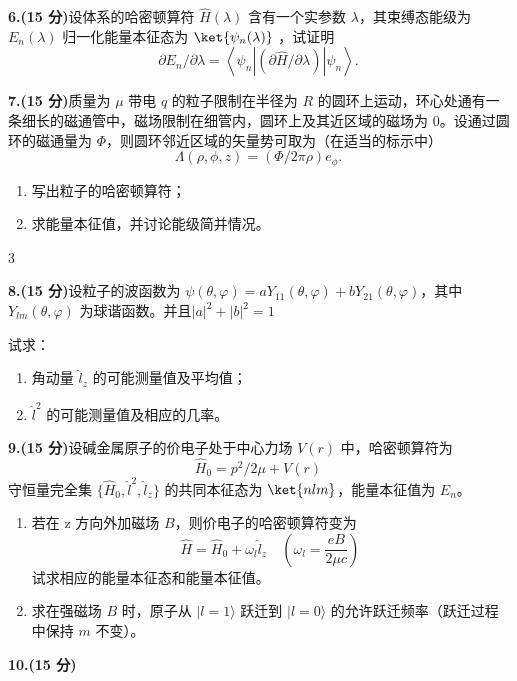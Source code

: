 \textbf{6.(15 分)}设体系的哈密顿算符 $\hat{H}(\lambda)$ 含有一个实参数 $\lambda$，其束缚态能级为 $E_n(\lambda)$ 归一化能量本征态为 $\ket{\psi_n(\lambda)}$ ，试证明
\[
\partial E_n/\partial \lambda = \left\langle \psi_n \left| (\partial \hat{H}/\partial \lambda) \right| \psi_n \right\rangle.~
\]

\textbf{7.(15 分)}质量为 $\mu$ 带电 $q$ 的粒子限制在半径为 $R$ 的圆环上运动，环心处通有一条细长的磁通管中，磁场限制在细管内，圆环上及其近区域的磁场为 $0$。设通过圆环的磁通量为 $\Phi$，则圆环邻近区域的矢量势可取为（在适当的标示中）
\[
\Lambda(\rho, \phi, z) = \left( \Phi/2\pi\rho \right) e_\phi.~
\]

\begin{enumerate}
    \item 写出粒子的哈密顿算符；
    \item 求能量本征值，并讨论能级简并情况。
\end{enumerate}3

\textbf{8.(15 分)}设粒子的波函数为 $\psi(\theta, \varphi) = aY_{11}(\theta, \varphi) + bY_{21}(\theta, \varphi)$，其中 $Y_{lm}(\theta, \varphi)$ 为球谐函数。并且$|a|^2 + |b|^2 = 1$

试求：
\begin{enumerate}
    \item  角动量 $\hat{l}_z$ 的可能测量值及平均值；
    \item  $\hat{l}^2$ 的可能测量值及相应的几率。
\end{enumerate}

\textbf{9.(15 分)}设碱金属原子的价电子处于中心力场 $V(r)$ 中，哈密顿算符为
\[
\hat{H}_0 =p^2/2\mu + V(r)~
\]
守恒量完全集 $\{\hat{H}_0, \hat{l}^2, \hat{l}_z\}$ 的共同本征态为 $\ket{nlm}$，能量本征值为 $E_n$。

\begin{enumerate}
    \item  若在 z 方向外加磁场 $B$，则价电子的哈密顿算符变为
    \[
    \hat{H} = \hat{H}_0 + \omega_l \hat{l}_z \quad (\omega_l = \frac{eB}{2\mu c})~
    \]
    试求相应的能量本征态和能量本征值。

    \item  求在强磁场 $B$ 时，原子从 $| l = 1 \rangle$ 跃迁到 $| l = 0 \rangle$ 的允许跃迁频率（跃迁过程中保持 $m$ 不变）。
\end{enumerate}
\textbf{10.(15 分)}